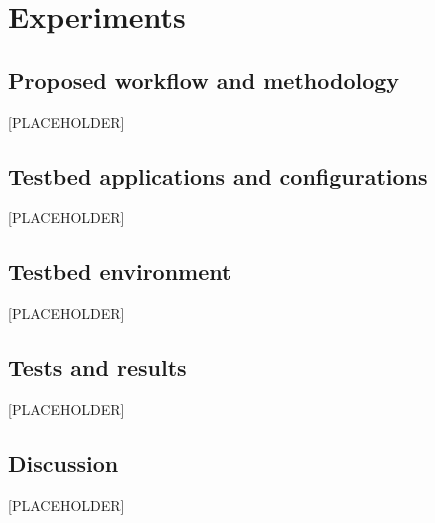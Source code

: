 \chapter{Experiments}

\section{Proposed workflow and methodology}

[PLACEHOLDER]

\section{Testbed applications and configurations}

[PLACEHOLDER]

\section{Testbed environment}

[PLACEHOLDER]

\section{Tests and results}

[PLACEHOLDER]

\section{Discussion}

[PLACEHOLDER]